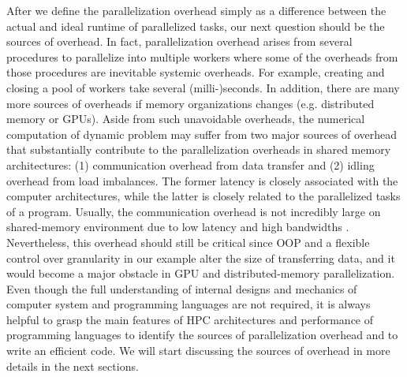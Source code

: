 \documentclass[12pt]{article}
\begin{document}
After we define the parallelization overhead simply as a difference between the actual and ideal runtime of parallelized tasks, our next question should be the sources of overhead. In fact, parallelization overhead arises from several procedures to parallelize into multiple workers where some of the overheads from those procedures are inevitable systemic overheads. For example, creating and closing a pool of workers take several (milli-)seconds. In addition, there are many more sources of overheads if memory organizations changes (e.g. distributed memory or GPUs). Aside from such unavoidable overheads, the numerical computation of dynamic problem may suffer from two major sources of overhead that substantially contribute to the parallelization overheads in shared memory architectures: (1) communication overhead from data transfer and (2) idling overhead from load imbalances. The former latency is closely associated with the computer architectures, while the latter is closely related to the parallelized tasks of a program. Usually, the communication overhead is not incredibly large on shared-memory environment due to low latency and high bandwidths \citep{Hager-Wellein-11}. Nevertheless, this overhead should still be critical since OOP and a flexible control over granularity in our example alter the size of transferring data, and it would become a major obstacle in GPU and distributed-memory parallelization. Even though the full understanding of internal designs and mechanics of computer system and programming languages are not required, it is always helpful to grasp the main features of HPC architectures and performance of programming languages to identify the sources of parallelization overhead and to write an efficient code. We will start discussing the sources of overhead in more details in the next sections.
\end{document}
